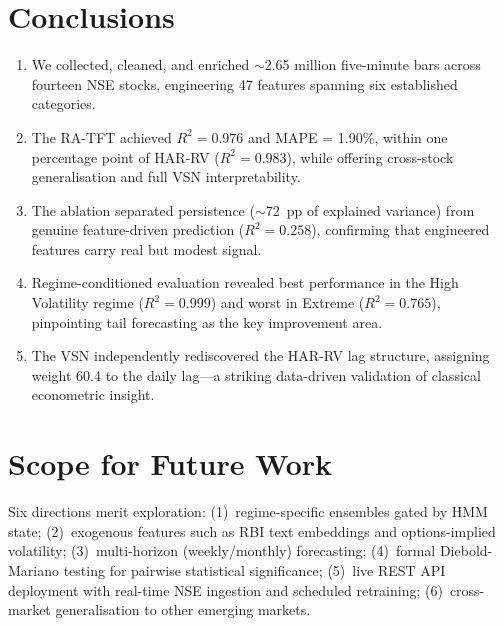 \section{Conclusions}

\begin{enumerate}
\item We collected, cleaned, and enriched $\sim$2.65 million five-minute bars across fourteen NSE stocks, engineering 47 features spanning six established categories.
\item The RA-TFT achieved $R^2 = 0.976$ and MAPE = 1.90\%, within one percentage point of HAR-RV ($R^2 = 0.983$), while offering cross-stock generalisation and full VSN interpretability.
\item The ablation separated persistence ($\sim$72~pp of explained variance) from genuine feature-driven prediction ($R^2 = 0.258$), confirming that engineered features carry real but modest signal.
\item Regime-conditioned evaluation revealed best performance in the High Volatility regime ($R^2 = 0.999$) and worst in Extreme ($R^2 = 0.765$), pinpointing tail forecasting as the key improvement area.
\item The VSN independently rediscovered the HAR-RV lag structure, assigning weight 60.4 to the daily lag---a striking data-driven validation of classical econometric insight.
\end{enumerate}

\section{Scope for Future Work}

Six directions merit exploration: (1)~regime-specific ensembles gated by HMM state; (2)~exogenous features such as RBI text embeddings and options-implied volatility; (3)~multi-horizon (weekly/monthly) forecasting; (4)~formal Diebold-Mariano testing for pairwise statistical significance; (5)~live REST API deployment with real-time NSE ingestion and scheduled retraining; (6)~cross-market generalisation to other emerging markets.

